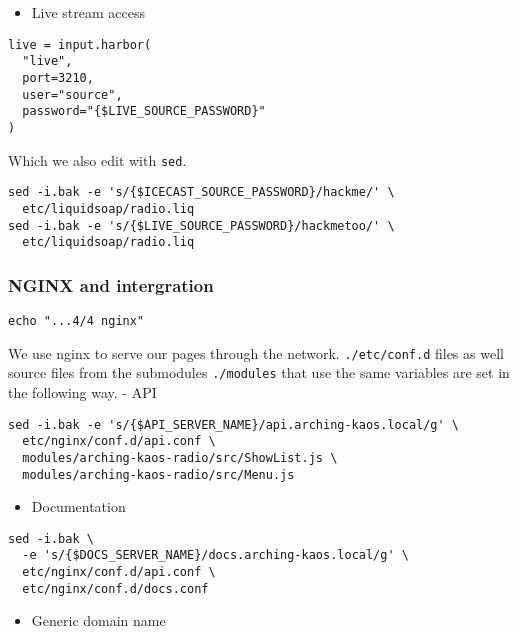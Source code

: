 \documentclass[12pt]{report}
\begin{document}
\begin{itemize}

\item
  Live stream access
\end{itemize}

\begin{verbatim}
live = input.harbor(
  "live",
  port=3210,
  user="source",
  password="{$LIVE_SOURCE_PASSWORD}"
) 
\end{verbatim}

Which we also edit with \texttt{sed}.

\begin{verbatim}
sed -i.bak -e 's/{$ICECAST_SOURCE_PASSWORD}/hackme/' \
  etc/liquidsoap/radio.liq
sed -i.bak -e 's/{$LIVE_SOURCE_PASSWORD}/hackmetoo/' \
  etc/liquidsoap/radio.liq
\end{verbatim}


\subsubsection{NGINX and intergration}\label{nginx-and-intergration}

\begin{verbatim}
echo "...4/4 nginx"
\end{verbatim}

We use nginx to serve our pages through the network.
\texttt{./etc/conf.d} files as well source files from the submodules
\texttt{./modules} that use the same variables are set in the following
way. - API

\begin{verbatim}
sed -i.bak -e 's/{$API_SERVER_NAME}/api.arching-kaos.local/g' \
  etc/nginx/conf.d/api.conf \
  modules/arching-kaos-radio/src/ShowList.js \
  modules/arching-kaos-radio/src/Menu.js
\end{verbatim}

\begin{itemize}

\item
  Documentation
\end{itemize}

\begin{verbatim}
sed -i.bak \
  -e 's/{$DOCS_SERVER_NAME}/docs.arching-kaos.local/g' \
  etc/nginx/conf.d/api.conf \
  etc/nginx/conf.d/docs.conf
\end{verbatim}

\begin{itemize}

\item
  Generic domain name
\end{itemize}
\end{document}
